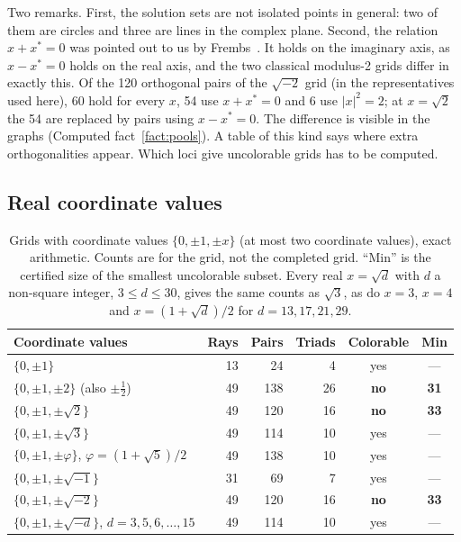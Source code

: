 Two remarks.  First, the solution sets are not isolated points in general: two of them are
circles and three are lines in the complex plane.  Second, the relation $x+x^{*}=0$ was pointed
out to us by Frembs~\cite{Frembs2026}.  It holds on the imaginary axis, as $x-x^{*}=0$ holds on
the real axis, and the two classical modulus-2 grids differ in exactly this.  Of the 120
orthogonal pairs of the $\sqrt{-2}$ grid (in the representatives used here), 60 hold for
every $x$, 54 use $x+x^{*}=0$ and 6 use $|x|^2=2$; at $x=\sqrt2$ the 54 are replaced by pairs
using $x-x^{*}=0$.  The difference is visible in the graphs (Computed fact~\ref{fact:pools}).
A table of this kind says where extra orthogonalities appear.  Which loci give uncolorable
grids has to be computed.

\subsection{Real coordinate values}

\begin{table}[t]
\centering
\caption{Grids with coordinate values $\{0,\pm1,\pm x\}$ (at most two coordinate values), exact arithmetic.  Counts are for the grid, not the completed grid.  ``Min'' is the
certified size of the smallest uncolorable subset.  Every real $x=\sqrt d$ with $d$ a non-square
integer, $3\le d\le30$, gives the same counts as $\sqrt3$, as do $x=3$, $x=4$ and
$x=(1+\sqrt d)/2$ for $d=13,17,21,29$.}
\label{tab:alphabets}
\begin{tabular}{lrrrcc}
\toprule
Coordinate values & Rays & Pairs & Triads & Colorable & Min \\
\midrule
$\{0,\pm1\}$ & 13 & 24 & 4 & yes & --- \\
$\{0,\pm1,\pm2\}$ (also $\pm\tfrac12$) & 49 & 138 & 26 & \textbf{no} & \textbf{31} \\
$\{0,\pm1,\pm\sqrt2\}$ & 49 & 120 & 16 & \textbf{no} & \textbf{33} \\
$\{0,\pm1,\pm\sqrt3\}$ & 49 & 114 & 10 & yes & --- \\
$\{0,\pm1,\pm\varphi\}$, $\varphi=(1+\sqrt5)/2$ & 49 & 138 & 10 & yes & --- \\
\midrule
$\{0,\pm1,\pm\sqrt{-1}\}$ & 31 & 69 & 7 & yes & --- \\
$\{0,\pm1,\pm\sqrt{-2}\}$ & 49 & 120 & 16 & \textbf{no} & \textbf{33} \\
$\{0,\pm1,\pm\sqrt{-d}\}$, $d=3,5,6,\dots,15$ & 49 & 114 & 10 & yes & --- \\
\bottomrule
\end{tabular}
\end{table}

